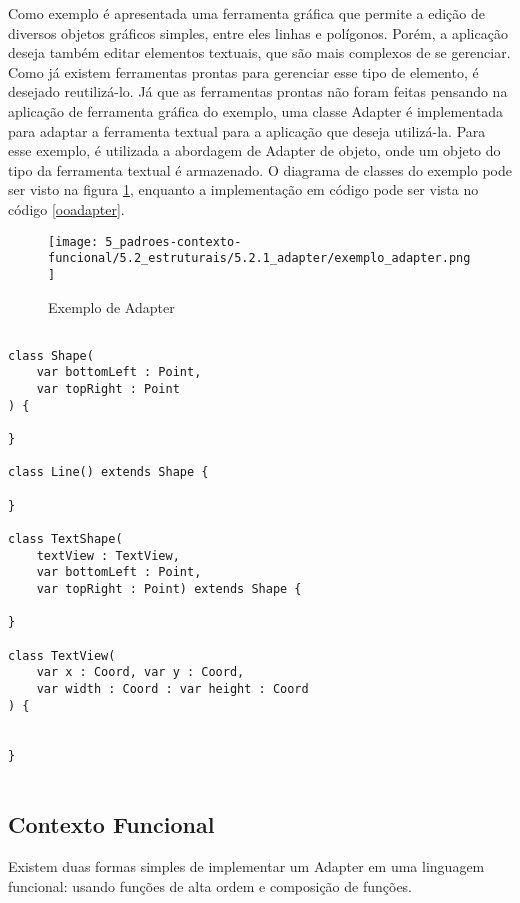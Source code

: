 Como exemplo é apresentada uma ferramenta gráfica 
que permite a edição de diversos objetos gráficos 
simples, entre eles linhas e polígonos. Porém, 
a aplicação deseja também editar elementos textuais, 
que são mais complexos de se gerenciar. Como já existem 
ferramentas prontas para gerenciar esse tipo de 
elemento, é desejado reutilizá-lo. Já que as 
ferramentas prontas não foram feitas pensando na 
aplicação de ferramenta gráfica do exemplo, uma 
classe Adapter é implementada para adaptar a 
ferramenta textual para a aplicação que deseja 
utilizá-la. Para esse exemplo, é utilizada a 
abordagem de Adapter de objeto, onde um objeto 
do tipo da ferramenta textual é armazenado. O 
diagrama de classes do exemplo pode ser visto na 
figura \ref{adapter_exemplo}, enquanto a 
implementação em código pode ser vista no código 
\ref{ooadapter}.


\begin{figure}[htb]
	\caption{\label{adapter_exemplo}Exemplo de Adapter}
	\begin{center}
	    \texttt{[image: 5\_padroes-contexto-funcional/5.2\_estruturais/5.2.1\_adapter/exemplo\_adapter.png]}
	\end{center}
\end{figure}


\begin{lstlisting}[caption={Adapter Orientado a Objetos},label=ooadapter]

class Shape(
	var bottomLeft : Point, 
	var topRight : Point
) {

}

class Line() extends Shape {

}

class TextShape(
	textView : TextView,
	var bottomLeft : Point, 
	var topRight : Point) extends Shape {

}

class TextView(
	var x : Coord, var y : Coord,
	var width : Coord : var height : Coord
) {


}


\end{lstlisting}



\subsection*{Contexto Funcional}

Existem duas formas simples de implementar um Adapter em uma linguagem 
funcional: usando funções de alta ordem e composição de funções.


